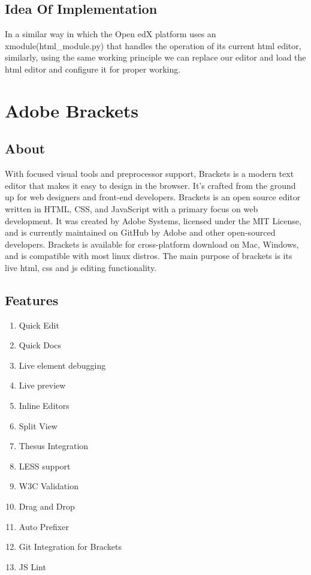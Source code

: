 \subsection{Idea Of Implementation }
In a similar way in which the Open edX platform uses an xmodule(html\_module.py) that
handles the operation of its current html editor, similarly, using the same working principle
we can replace our editor and load the html editor and configure it for proper working.  \newline

\section{Adobe Brackets}
\subsection{About}
With focused visual tools and preprocessor support, Brackets is a modern text editor that
makes it easy to design in the browser. It's crafted from the ground up for web designers and
front-end developers. \newline 
Brackets is an open source editor written in HTML, CSS, and JavaScript with a primary
focus on web development. It was created by Adobe Systems, licensed under the MIT
License, and is currently maintained on GitHub by Adobe and other open-sourced
developers. Brackets is available for cross-platform download on Mac, Windows, and is
compatible with most linux distros. The main purpose of brackets is its live html, css and js
editing functionality.
\subsection{Features}
\begin{enumerate}
\item Quick Edit
\item Quick Docs
\item Live element debugging
\item Live preview
\item Inline Editors
\item Split View
\item Thesus Integration
\item LESS support
\item W3C Validation
\item Drag and Drop
\item Auto Prefixer
\item Git Integration for Brackets
\item JS Lint
\end{enumerate}
